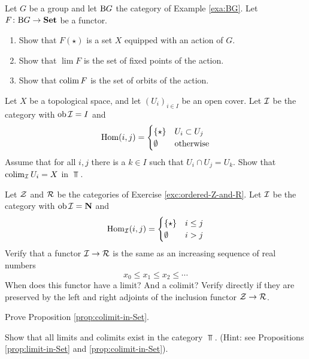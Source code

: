 \begin{exercise}
Let $G$ be a group and let ${\mathrm B} G$ the category of Example \ref{exa:BG}. Let $F\colon {\mathrm B} G \to \mathbf{Set}$ be a functor. 
\begin{enumerate}
\item Show that $F(\star)$ is a set $X$ equipped with an action of $G$.
\item Show that $\lim F$ is the set of fixed points of the action.
\item Show that $\operatorname{colim} F$ is the set of orbits of the action. 
\end{enumerate}
\end{exercise}

\begin{exercise}
Let $X$ be a topological space, and let $(U_i)_{i\in I}$ be an open cover. Let ${\mathcal{I}}$ be the category with $\operatorname{ob} {\mathcal{I}} = I$ and
\[
	\operatorname{Hom}(i,j) = \begin{cases} \{\star\} & U_i \subset U_j \\ \emptyset & \text{otherwise} \end{cases}
\]
Assume that for all $i,j$ there is a $k\in I$ such that $U_i \cap U_j = U_k$. Show that $\operatorname{colim}_{\mathcal{I}} U_i = X$ in $\Top$.
\end{exercise}

\begin{exercise}
Let ${\mathcal{Z}}$ and ${\mathcal{R}}$ be the categories of Exercise \ref{exc:ordered-Z-and-R}. Let ${\mathcal{I}}$ be the category with $\operatorname{ob} {\mathcal{I}} = {\mathbf{N}}$ and
\[
	\operatorname{Hom}_{\mathcal{I}}(i,j) = \begin{cases} \{\star\} & i\leq j \\ \emptyset & i > j \end{cases}
\]
Verify that a functor ${\mathcal{I}} \to {\mathcal{R}}$ is the same as an increasing sequence of real numbers
\[
	x_0 \leq x_1 \leq x_2 \leq \cdots
\]
When does this functor have a limit? And a colimit? Verify directly if they are preserved by the left and right adjoints of the inclusion functor ${\mathcal{Z}} \to {\mathcal{R}}$.
\end{exercise}

\begin{exercise}\label{exc:colimit-in-Set}
Prove Proposition \ref{prop:colimit-in-Set}.
\end{exercise}

\begin{exercise}Show that all limits and colimits exist in the category $\Top$. 
(Hint: see Propositions \ref{prop:limit-in-Set} and \ref{prop:colimit-in-Set}).
\end{exercise}

